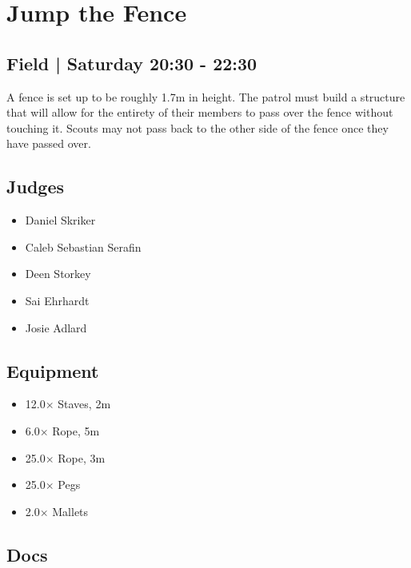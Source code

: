 \documentclass[10pt]{article}
\begin{document}
		\begin{minipage}{\linewidth}
		\setcounter{section}{22}
	\section{Jump the Fence }
	\subsection*{Field | Saturday 20:30 - 22:30}

	A fence is set up to be roughly 1.7m in height. The patrol must build a structure that will allow for the entirety of their members to pass over the fence without touching it. Scouts may not pass back to the other side of the fence once they have passed over.

	\begin{multicols}{2}
	\subsection*{\faUsers \: Judges}
	\begin{itemize}
			\item Daniel Skriker
			\item Caleb Sebastian Serafin
			\item Deen Storkey
			\item Sai Ehrhardt
			\item Josie Adlard
		\end{itemize}
	\columnbreak
	\subsection*{\faWrench \: Equipment}
	
        \begin{itemize}
                    \item 12.0$\times$ \: Staves, 2m
                    \item 6.0$\times$ \: Rope, 5m
                    \item 25.0$\times$ \: Rope, 3m
                    \item 25.0$\times$ \: Pegs
                    \item 2.0$\times$ \: Mallets
                \end{itemize}
                \vfill\null
        \subsection*{\faFile \: Docs}
     	\end{multicols}


	\vspace{1cm}
	\end{minipage}
\end{document}
